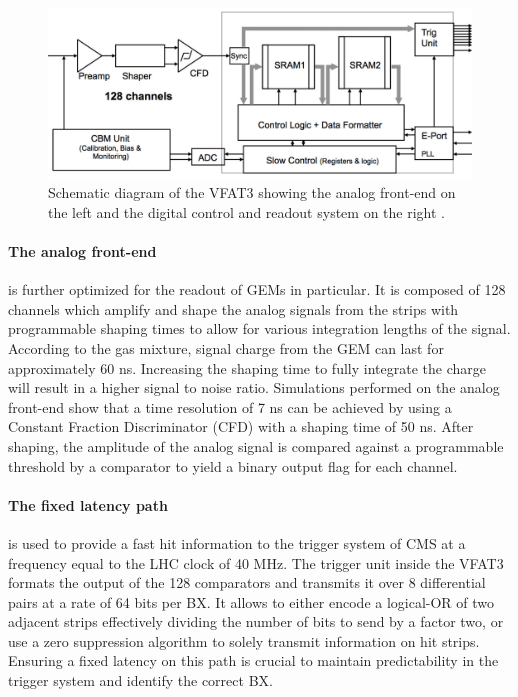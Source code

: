       \begin{figure}[h!]
        \centering
        \includegraphics[width=\textwidth]{img/II-2-daq/vfat3.pdf}
        \caption{Schematic diagram of the VFAT3 showing the analog front-end on the left and the digital control and readout system on the right \cite{Colaleo:2021453}.}
        \label{fig:II-2-vfat3}
      \end{figure}

      \paragraph{The analog front-end} is further optimized for the readout of GEMs in particular. It is composed of 128 channels which amplify and shape the analog signals from the strips with programmable shaping times to allow for various integration lengths of the signal. According to the gas mixture, signal charge from the GEM can last for approximately 60 ns. Increasing the shaping time to fully integrate the charge will result in a higher signal to noise ratio. Simulations performed on the analog front-end show that a time resolution of 7 ns can be achieved by using a Constant Fraction Discriminator (CFD) with a shaping time of 50 ns. After shaping, the amplitude of the analog signal is compared against a programmable threshold by a comparator to yield a binary output flag for each channel. \\

      \paragraph{The fixed latency path} is used to provide a fast hit information to the trigger system of CMS at a frequency equal to the LHC clock of 40 MHz. The trigger unit inside the VFAT3 formats the output of the 128 comparators and transmits it over 8 differential pairs at a rate of 64 bits per BX. It allows to either encode a logical-OR of two adjacent strips effectively dividing the number of bits to send by a factor two, or use a zero suppression algorithm to solely transmit information on hit strips. Ensuring a fixed latency on this path is crucial to maintain predictability in the trigger system and identify the correct BX. \\

